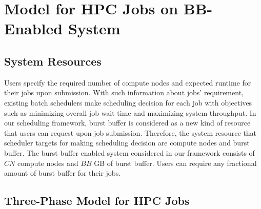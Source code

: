 \section{Model for HPC Jobs on BB-Enabled System}
\label{Sec:Model}

\subsection{System Resources}

Users specify the required number of compute nodes and expected runtime for their jobs upon submission. 
With such information about jobs' requirement, 
existing batch schedulers make scheduling decision for each job with objectives 
such as minimizing overall job wait time and maximizing system throughput. 
In our scheduling framework, 
burst buffer is considered as a new kind of resource that users can request upon job submission. 
Therefore, the system resource that scheduler targets for making scheduling decision are
compute nodes and burst buffer.
The burst buffer enabled system considered in our framework consists of 
$CN$ compute nodes and $BB$ GB of burst buffer. 
Users can require any fractional amount of burst buffer for their jobs. 



\subsection{Three-Phase Model for HPC Jobs}



